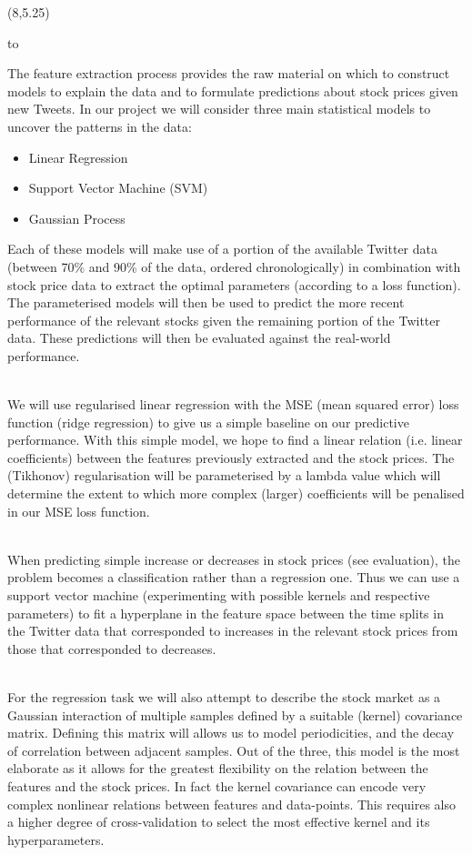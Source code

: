 \documentclass[a0]{a0poster}
\def\Head#1{\noindent\hbox to \hsize{\hfil{\LARGE\color{DarkBlue}\sf #1}}\bigskip}
\def\Subhead#1{\noindent{\large\color{DarkBlue}\sf #1}\bigskip}
\begin{document}
\begin{textblock}{7}(8,5.25)

\Head{Machine Learning}

\sf
The feature extraction process provides the raw material on which to construct models to explain the data and to formulate predictions about stock prices given new Tweets. In our project we will consider three main statistical models to uncover the patterns in the data:
\begin{itemize}
\item Linear Regression
\item Support Vector Machine (SVM)
\item Gaussian Process
\end{itemize}
Each of these models will make use of a portion of the available Twitter data (between 70\% and 90\% of the data, ordered chronologically) in combination with stock price data to extract the optimal parameters (according to a loss function). The parameterised models will then be used to predict the more recent performance of the relevant stocks given the remaining portion of the Twitter data. These predictions will then be evaluated against the real-world performance. 

\Subhead{Linear Regression}
\\We will use regularised linear regression with the MSE (mean squared error) loss function (ridge regression) to give us a simple baseline on our predictive performance. With this simple model, we hope to find a linear relation (i.e. linear coefficients) between the features previously extracted and the stock prices. The (Tikhonov) regularisation will be parameterised by a lambda value which will determine the extent to which more complex (larger) coefficients will be penalised in our MSE loss function.

\Subhead{SVM}
\\When predicting simple increase or decreases in stock prices (see evaluation), the problem becomes a classification rather than a regression one. Thus we can use a support vector machine (experimenting with possible kernels and respective parameters) to fit a hyperplane in the feature space between the time splits in the Twitter data that corresponded to increases in the relevant stock prices from those that corresponded to decreases. 

\Subhead{Gaussian Process}
\\For the regression task we will also attempt to describe the stock market as a Gaussian interaction of multiple samples defined by a suitable (kernel) covariance matrix. Defining this matrix will allows us to model periodicities, and the decay of correlation between adjacent samples. Out of the three, this model is the most elaborate as it allows for the greatest flexibility on the relation between the features and the stock prices. In fact the kernel covariance can encode very complex nonlinear relations between features and data-points.  This requires also a higher degree of cross-validation to select the most effective kernel and its hyperparameters.


\end{textblock}
\end{document}
